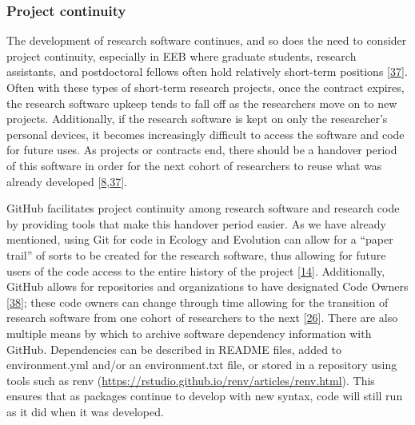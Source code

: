\hypertarget{project-continuity}{%
\subsubsection{Project continuity}\label{project-continuity}}

The development of research software continues, and so does the need to consider project continuity, especially in EEB where graduate students, research assistants, and postdoctoral fellows often hold relatively short-term positions {[}\protect\hyperlink{ref-D4C4k4ak}{37}{]}.
Often with these types of short-term research projects, once the contract expires, the research software upkeep tends to fall off as the researchers move on to new projects.
Additionally, if the research software is kept on only the researcher's personal devices, it becomes increasingly difficult to access the software and code for future uses.
As projects or contracts end, there should be a handover period of this software in order for the next cohort of researchers to reuse what was already developed {[}\protect\hyperlink{ref-4ny1onB0}{8},\protect\hyperlink{ref-D4C4k4ak}{37}{]}.

GitHub facilitates project continuity among research software and research code by providing tools that make this handover period easier.
As we have already mentioned, using Git for code in Ecology and Evolution can allow for a ``paper trail'' of sorts to be created for the research software, thus allowing for future users of the code access to the entire history of the project {[}\protect\hyperlink{ref-3DKwn1sY}{14}{]}.
Additionally, GitHub allows for repositories and organizations to have designated Code Owners {[}\protect\hyperlink{ref-s91uGRZ2}{38}{]}; these code owners can change through time allowing for the transition of research software from one cohort of researchers to the next {[}\protect\hyperlink{ref-iIEKCTLU}{26}{]}.
There are also multiple means by which to archive software dependency information with GitHub.
Dependencies can be described in README files, added to environment.yml and/or an environment.txt file, or stored in a repository using tools such as renv (\url{https://rstudio.github.io/renv/articles/renv.html}).
This ensures that as packages continue to develop with new syntax, code will still run as it did when it was developed.

